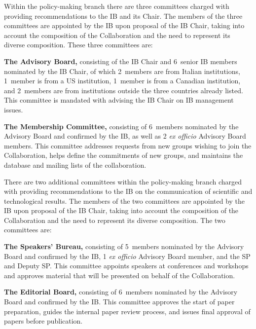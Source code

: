 Within the policy-making branch there are three committees charged with providing recommendations to the IB and its Chair.  The members of the three committees are appointed by the IB upon proposal of the IB Chair, taking into account the composition of the Collaboration and the need to represent its diverse composition.  These three committees are:

\begin{compactitem}
\item[\bf The Advisory Board,] consisting of the IB Chair and \num{6}~senior IB members nominated by the IB Chair, of which \num{2}~members are from Italian institutions, \num{1}~member is from a US institution, \num{1}~member is from a Canadian institution, and \num{2}~members are from institutions outside the three countries already listed.  This committee is mandated with advising the IB Chair on IB management issues.
\item[\bf The Membership Committee,] consisting of \num{6}~members nominated by the Advisory Board and confirmed by the IB, as well as \num{2} {\it ex officio} Advisory Board members.  This committee addresses requests from new groups wishing to join the Collaboration, helps define the commitments of new groups, and maintains the database and mailing lists of the collaboration.
\end{compactitem}
\smallskip
There are two additional committees within the policy-making branch charged with providing recommendations to the IB on the communication of scientific and technological results.  The members of the two committees are appointed by the IB upon proposal of the IB Chair, taking into account the composition of the Collaboration and the need to represent its diverse composition.  The two committees are:

\begin{compactenum}
\item[\bf The Speakers' Bureau,] consisting of \num{5}~members nominated by the Advisory Board and confirmed by the IB, \num{1} {\it ex officio} Advisory Board member, and the SP and Deputy SP.  This committee appoints speakers at conferences and workshops and approves material that will be presented on behalf of the Collaboration.
\item[\bf The Editorial Board,] consisting of \num{6}~members nominated by the Advisory Board and confirmed by the IB.  This committee approves the start of paper preparation, guides the internal paper review process, and issues final approval of papers before publication.
\end{compactenum}

